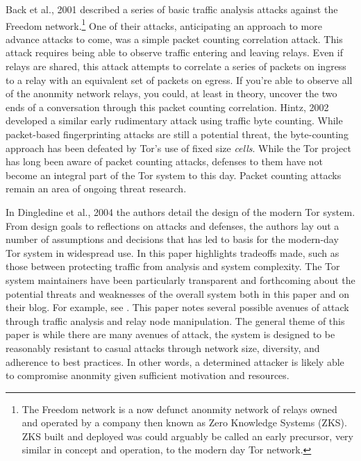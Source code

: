 \documentclass[sigconf]{acmart}
\begin{document}
Back et al., 2001 \cite{back_traffic_2001} described a series of basic
traffic analysis attacks against the Freedom network.\footnote{The
Freedom network is a now defunct anonmity network of relays owned and
operated by a company then known as Zero Knowledge Systems (ZKS).  ZKS
built and deployed was could arguably be called an early precursor, very
similar in concept and operation, to the modern day Tor network.}  One
of their attacks, anticipating an approach to more advance attacks to
come, was a simple packet counting correlation attack.  This attack
requires being able to observe traffic entering and leaving relays.
Even if relays are shared, this attack attempts to correlate a series of
packets on ingress to a relay with an equivalent set of packets on
egress.  If you're able to observe all of the anonmity network relays,
you could, at least in theory, uncover the two ends of a conversation
through this packet counting correlation.  Hintz, 2002
\cite{hintz_fingerprinting_2002} developed a similar early rudimentary
attack using traffic byte counting.  While packet-based fingerprinting
attacks are still a potential threat, the byte-counting approach has
been defeated by Tor's use of fixed size \emph{cells}.  While the Tor
project has long been aware of packet counting attacks, defenses to them
have not become an integral part of the Tor system to this day.  Packet
counting attacks remain an area of ongoing threat research.

In Dingledine et al., 2004 \cite{dingledine_tor:_2004} the authors
detail the design of the modern Tor system.  From design goals to
reflections on attacks and defenses, the authors lay out a number of
assumptions and decisions that has led to basis for the modern-day Tor
system in widespread use.  In this paper highlights tradeoffs made, such
as those between protecting traffic from analysis and system complexity.
The Tor system maintainers have been particularly transparent and
forthcoming about the potential threats and weaknesses of the overall
system both in this paper and on their blog.  For example, see
\cite{dingledine_research_2011}.  This paper notes several possible
avenues of attack through traffic analysis and relay node manipulation.
The general theme of this paper is while there are many avenues of
attack, the system is designed to be reasonably resistant to casual
attacks through network size, diversity, and adherence to best
practices.  In other words, a determined attacker is likely able to
compromise anonmity given sufficient motivation and resources.
\end{document}
